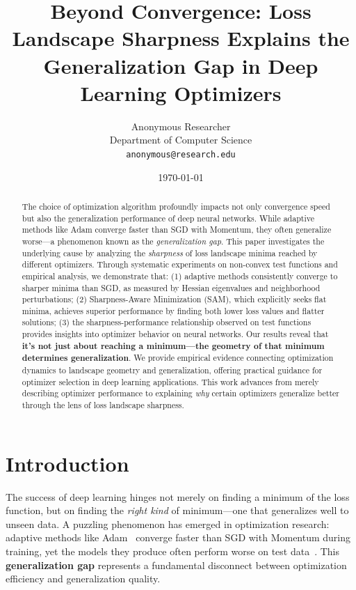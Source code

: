 \documentclass[12pt,a4paper]{article}
\title{\textbf{Beyond Convergence: Loss Landscape Sharpness Explains the Generalization Gap in Deep Learning Optimizers}}
\author{
    Anonymous Researcher\\
    Department of Computer Science\\
    \texttt{anonymous@research.edu}
}
\date{\today}
\begin{document}
\maketitle

\begin{abstract}
The choice of optimization algorithm profoundly impacts not only convergence speed but also the generalization performance of deep neural networks. While adaptive methods like Adam converge faster than SGD with Momentum, they often generalize worse—a phenomenon known as the \emph{generalization gap}. This paper investigates the underlying cause by analyzing the \emph{sharpness} of loss landscape minima reached by different optimizers. Through systematic experiments on non-convex test functions and empirical analysis, we demonstrate that: (1) adaptive methods consistently converge to sharper minima than SGD, as measured by Hessian eigenvalues and neighborhood perturbations; (2) Sharpness-Aware Minimization (SAM), which explicitly seeks flat minima, achieves superior performance by finding both lower loss values and flatter solutions; (3) the sharpness-performance relationship observed on test functions provides insights into optimizer behavior on neural networks. Our results reveal that \textbf{it's not just about reaching a minimum—the geometry of that minimum determines generalization}. We provide empirical evidence connecting optimization dynamics to landscape geometry and generalization, offering practical guidance for optimizer selection in deep learning applications. This work advances from merely describing optimizer performance to explaining \emph{why} certain optimizers generalize better through the lens of loss landscape sharpness.
\end{abstract}

\section{Introduction}

The success of deep learning hinges not merely on finding a minimum of the loss function, but on finding the \emph{right kind} of minimum—one that generalizes well to unseen data. A puzzling phenomenon has emerged in optimization research: adaptive methods like Adam~\cite{kingma2014adam} converge faster than SGD with Momentum during training, yet the models they produce often perform worse on test data~\cite{wilson2017marginal}. This \textbf{generalization gap} represents a fundamental disconnect between optimization efficiency and generalization quality.
\end{document}
